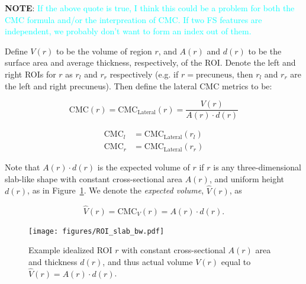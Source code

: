 \documentclass{article}
\newcommand{\note}[2][cyan]{\textbf{NOTE}: \textcolor{#1}{#2}}
\begin{document}
\note{If the above quote is true, I think this could be a problem for both the
CMC formula and/or the interpreation of CMC\@. If two FS features are independent,
we probably don't want to form an index out of them.}


Define \(V(r)\) to be the volume of region \(r\), and \(A(r)\) and \(d(r)\)
to be the surface area and average thickness, respectively, of the ROI\@.
Denote the left and right ROIs for \(r\) as \(r_l\) and \(r_r\) respectively
(e.g\@. if \(r=\text{precuneus}\), then \(r_l\) and \(r_r\) are the left and
right precuneus). Then define the lateral CMC metrics to be:

\begin{equation}
\text{CMC}(r) = \text{CMC}_{\text{Lateral}}(r) = \frac{V(r)}{A(r) \cdot d(r)}
\end{equation}

\begin{align}
\label{eq:cmc-laterals}
\text{CMC}_l &= \text{CMC}_{\text{Lateral}}(r_l) \\
\text{CMC}_r &= \text{CMC}_{\text{Lateral}}(r_r)
\end{align}

Note that \(A(r) \cdot d(r)\) is the expected volume of \(r\) if \(r\) is any
three-dimensional slab-like shape with constant cross-sectional area
\(A(r)\), and uniform height \(d(r)\), as in Figure~\ref{fig:slab}. We denote
the \emph{expected volume}, \(\hat{V}(r)\), as

\begin{equation}
\hat{V}(r) = \text{CMC}_{V}(r) = A(r) \cdot d(r).
\end{equation}


\begin{figure}
	\centering
	\texttt{[image: figures/ROI\_slab\_bw.pdf]}
	\caption{Example idealized ROI \(r\) with constant cross-sectional \(A(r)\)
	area and thickness \(d(r)\), and thus actual volume \(V(r)\) equal to
	\(\hat{V}(r) = A(r) \cdot d(r)\).}
	\label{fig:slab}
\end{figure}
\end{document}
